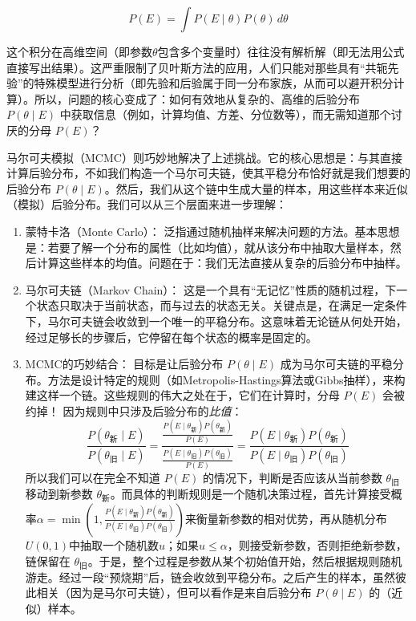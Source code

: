 \documentclass[
  twoside,12pt,fontset=none]{ctexbook}
\begin{document}
\[ P(E) = \int P(E \mid \theta) P(\theta) \, d\theta \]

这个积分在高维空间（即参数\(\theta\)包含多个变量时）往往没有解析解（即无法用公式直接写出结果）。这严重限制了贝叶斯方法的应用，人们只能对那些具有``共轭先验''的特殊模型进行分析（即先验和后验属于同一分布家族，从而可以避开积分计算）。所以，问题的核心变成了：如何有效地从复杂的、高维的后验分布 \(P(\theta \mid E)\) 中获取信息（例如，计算均值、方差、分位数等），而无需知道那个讨厌的分母 \(P(E)\)？

马尔可夫模拟（MCMC）则巧妙地解决了上述挑战。它的核心思想是：与其直接计算后验分布，不如我们构造一个马尔可夫链，使其平稳分布恰好就是我们想要的后验分布 \(P(\theta \mid E)\)。然后，我们从这个链中生成大量的样本，用这些样本来近似（模拟）后验分布。我们可以从三个层面来进一步理解：

\begin{enumerate}
\def\labelenumi{\arabic{enumi}.}
\item
  蒙特卡洛（Monte Carlo）： 泛指通过随机抽样来解决问题的方法。基本思想是：若要了解一个分布的属性（比如均值），就从该分布中抽取大量样本，然后计算这些样本的均值。问题在于：我们无法直接从复杂的后验分布中抽样。
\item
  马尔可夫链（Markov Chain）： 这是一个具有``无记忆''性质的随机过程，下一个状态只取决于当前状态，而与过去的状态无关。关键点是，在满足一定条件下，马尔可夫链会收敛到一个唯一的平稳分布。这意味着无论链从何处开始，经过足够长的步骤后，它停留在每个状态的概率是固定的。
\item
  MCMC的巧妙结合：
  目标是让后验分布 \(P(\theta \mid E)\) 成为马尔可夫链的平稳分布。方法是设计特定的规则（如Metropolis-Hastings算法或Gibbs抽样），来构建这样一个链。这些规则的伟大之处在于，它们在计算时，分母 \(P(E)\) 会被约掉！ 因为规则中只涉及后验分布的\emph{比值}：
  \[ \frac{P(\theta_{\text{新}} \mid E)}{P(\theta_{\text{旧}} \mid E)} = \frac{\frac{P(E \mid \theta_{\text{新}})P(\theta_{\text{新}})}{P(E)}}{\frac{P(E \mid \theta_{\text{旧}})P(\theta_{\text{旧}})}{P(E)}} = \frac{P(E \mid \theta_{\text{新}})P(\theta_{\text{新}})}{P(E \mid \theta_{\text{旧}})P(\theta_{\text{旧}})} \]
  所以我们可以在完全不知道 \(P(E)\) 的情况下，判断是否应该从当前参数 \(\theta_{\text{旧}}\) 移动到新参数 \(\theta_{\text{新}}\)。而具体的判断规则是一个随机决策过程，首先计算接受概率\(\alpha = \min \left( 1, \frac{P(E \mid \theta_{\text{新}})P(\theta_{\text{新}})}{P(E \mid \theta_{\text{旧}})P(\theta_{\text{旧}})} \right)\)来衡量新参数的相对优势，再从随机分布\(U(0,1)\)中抽取一个随机数\(u\)；如果\(u \leq \alpha\)，则接受新参数，否则拒绝新参数，链保留在 \(\theta_{\text{旧}}\)。于是，整个过程是参数从某个初始值开始，然后根据规则随机游走。经过一段``预烧期''后，链会收敛到平稳分布。之后产生的样本，虽然彼此相关（因为是马尔可夫链），但可以看作是来自后验分布 \(P(\theta \mid E)\) 的（近似）样本。
\end{enumerate}
\end{document}
